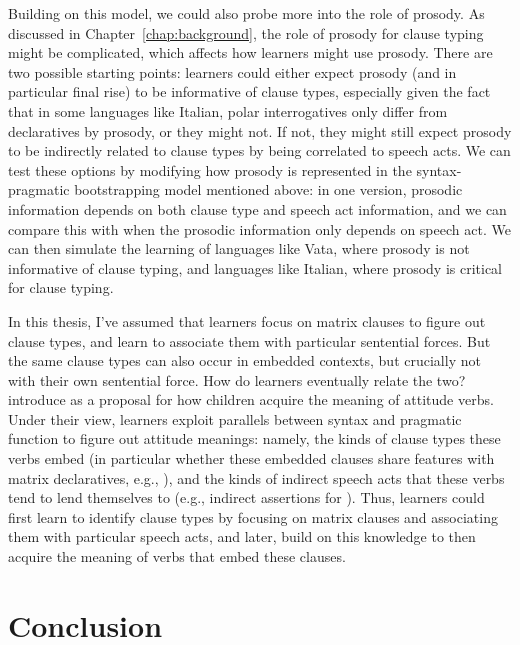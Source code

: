 Building on this model, we could also probe more into the role of prosody. As discussed in Chapter~\ref{chap:background}, the role of prosody for clause typing might be complicated, which affects how learners might use prosody. There are two possible starting points: learners could either expect prosody (and in particular final rise) to be informative of clause types, especially given the fact that in some languages like Italian, polar interrogatives only differ from declaratives by prosody, or they might not. If not, they might still expect prosody to be indirectly related to clause types by being correlated to speech acts. We can test these options by modifying how prosody is represented in the syntax-pragmatic bootstrapping model mentioned above: in one version, prosodic information depends on both clause type and speech act information, and we can compare this with when the prosodic information only depends on speech act. We can then simulate the learning of languages like Vata, where prosody is not informative of clause typing, and languages like Italian, where prosody is critical for clause typing. 

In this thesis, I've assumed that learners focus on matrix clauses to figure out clause types, and learn to associate them with particular sentential forces. But the same clause types can also occur in embedded contexts, but crucially not with their own sentential force. How do learners eventually relate the two? \textcite{hacquardlidz2018} introduce \hypos{} as a proposal for how children acquire the meaning of attitude verbs. Under their view, learners exploit parallels between syntax and pragmatic function to figure out attitude meanings: namely, the kinds of clause types these verbs embed (in particular whether these embedded clauses share features with matrix declaratives, e.g., ), and the kinds of indirect speech acts that these verbs tend to lend themselves to (e.g., indirect assertions for ). Thus, learners could first learn to identify clause types by focusing on matrix clauses and associating them with particular speech acts, and later, build on this knowledge to then acquire the meaning of verbs that embed these clauses. 


\section{Conclusion}

